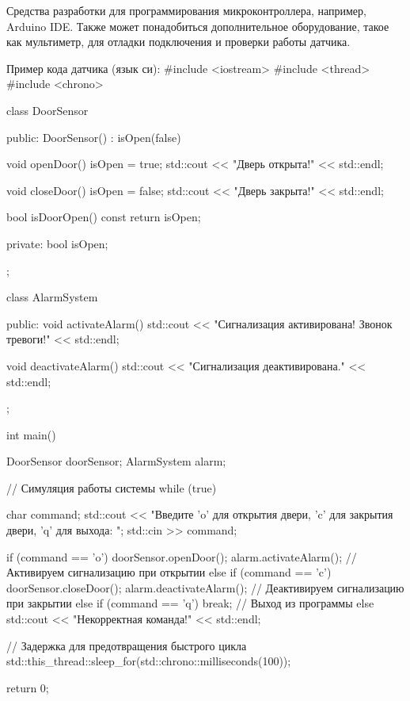 Средства разработки для программирования микроконтроллера, например, Arduino IDE.
Также может понадобиться дополнительное оборудование, такое как мультиметр, для отладки подключения и проверки работы датчика.

Пример кода датчика (язык си):
#include <iostream>
#include <thread>
#include <chrono>

class DoorSensor {
public:
    DoorSensor() : isOpen(false) {}

    void openDoor() {
        isOpen = true;
        std::cout << "Дверь открыта!" << std::endl;
    }

    void closeDoor() {
        isOpen = false;
        std::cout << "Дверь закрыта!" << std::endl;
    }

    bool isDoorOpen() const {
        return isOpen;
    }

private:
    bool isOpen;
};

class AlarmSystem {
public:
    void activateAlarm() {
        std::cout << "Сигнализация активирована! Звонок тревоги!" << std::endl;
    }

    void deactivateAlarm() {
        std::cout << "Сигнализация деактивирована." << std::endl;
    }
};

int main() {
    DoorSensor doorSensor;
    AlarmSystem alarm;

    // Симуляция работы системы
    while (true) {
        char command;
        std::cout << "Введите 'o' для открытия двери, 'c' для закрытия двери, 'q' для выхода: ";
        std::cin >> command;

        if (command == 'o') {
            doorSensor.openDoor();
            alarm.activateAlarm(); // Активируем сигнализацию при открытии
        } else if (command == 'c') {
            doorSensor.closeDoor();
            alarm.deactivateAlarm(); // Деактивируем сигнализацию при закрытии
        } else if (command == 'q') {
            break; // Выход из программы
        } else {
            std::cout << "Некорректная команда!" << std::endl;
        }

        // Задержка для предотвращения быстрого цикла
        std::this_thread::sleep_for(std::chrono::milliseconds(100));
    }

    return 0;
}

